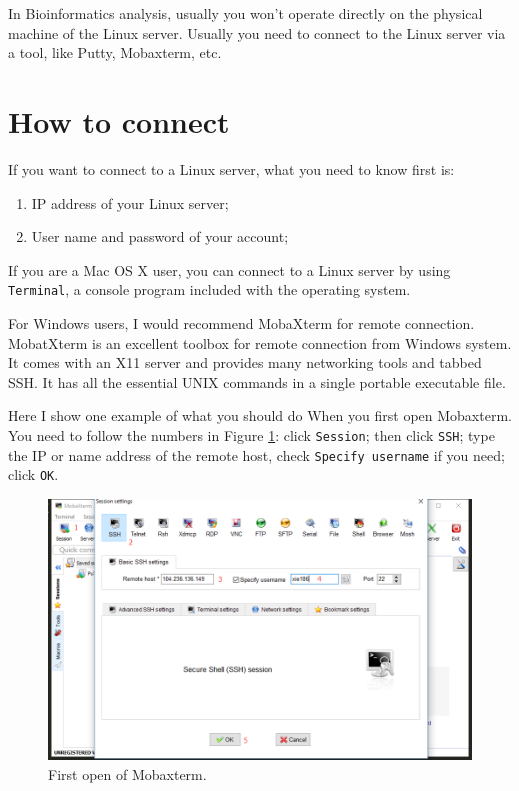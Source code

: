 \documentclass[]{book}
\theoremstyle{definition}
\theoremstyle{definition}
\theoremstyle{definition}
\theoremstyle{remark}
\begin{document}
In Bioinformatics analysis, usually you won't operate directly on the
physical machine of the Linux server. Usually you need to connect to the
Linux server via a tool, like Putty, Mobaxterm, etc.

\section{How to connect}\label{how-to-connect}

If you want to connect to a Linux server, what you need to know first
is:

\begin{enumerate}
\def\labelenumi{\arabic{enumi})}
\item
  IP address of your Linux server;
\item
  User name and password of your account;
\end{enumerate}

If you are a Mac OS X user, you can connect to a Linux server by using
\texttt{Terminal}, a console program included with the operating system.

For Windows users, I would recommend MobaXterm for remote connection.
MobatXterm is an excellent toolbox for remote connection from Windows
system. It comes with an X11 server and provides many networking tools
and tabbed SSH. It has all the essential UNIX commands in a single
portable executable file.

Here I show one example of what you should do When you first open
Mobaxterm. You need to follow the numbers in Figure
\ref{fig:mobaxtermInit}: click \texttt{Session}; then click
\texttt{SSH}; type the IP or name address of the remote host, check
\texttt{Specify\ username} if you need; click \texttt{OK}.



\begin{figure}
\centering
\includegraphics{figures/mobaxterm_init.png}
\caption{\label{fig:mobaxtermInit}First open of Mobaxterm.}
\end{figure}
\end{document}

